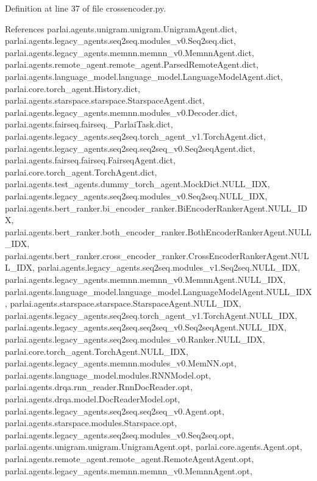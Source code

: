 Definition at line 37 of file crossencoder.\+py.



References parlai.\+agents.\+unigram.\+unigram.\+Unigram\+Agent.\+dict, parlai.\+agents.\+legacy\+\_\+agents.\+seq2seq.\+modules\+\_\+v0.\+Seq2seq.\+dict, parlai.\+agents.\+legacy\+\_\+agents.\+memnn.\+memnn\+\_\+v0.\+Memnn\+Agent.\+dict, parlai.\+agents.\+remote\+\_\+agent.\+remote\+\_\+agent.\+Parsed\+Remote\+Agent.\+dict, parlai.\+agents.\+language\+\_\+model.\+language\+\_\+model.\+Language\+Model\+Agent.\+dict, parlai.\+core.\+torch\+\_\+agent.\+History.\+dict, parlai.\+agents.\+starspace.\+starspace.\+Starspace\+Agent.\+dict, parlai.\+agents.\+legacy\+\_\+agents.\+memnn.\+modules\+\_\+v0.\+Decoder.\+dict, parlai.\+agents.\+fairseq.\+fairseq.\+\_\+\+Parlai\+Task.\+dict, parlai.\+agents.\+legacy\+\_\+agents.\+seq2seq.\+torch\+\_\+agent\+\_\+v1.\+Torch\+Agent.\+dict, parlai.\+agents.\+legacy\+\_\+agents.\+seq2seq.\+seq2seq\+\_\+v0.\+Seq2seq\+Agent.\+dict, parlai.\+agents.\+fairseq.\+fairseq.\+Fairseq\+Agent.\+dict, parlai.\+core.\+torch\+\_\+agent.\+Torch\+Agent.\+dict, parlai.\+agents.\+test\+\_\+agents.\+dummy\+\_\+torch\+\_\+agent.\+Mock\+Dict.\+N\+U\+L\+L\+\_\+\+I\+DX, parlai.\+agents.\+legacy\+\_\+agents.\+seq2seq.\+modules\+\_\+v0.\+Seq2seq.\+N\+U\+L\+L\+\_\+\+I\+DX, parlai.\+agents.\+bert\+\_\+ranker.\+bi\+\_\+encoder\+\_\+ranker.\+Bi\+Encoder\+Ranker\+Agent.\+N\+U\+L\+L\+\_\+\+I\+DX, parlai.\+agents.\+bert\+\_\+ranker.\+both\+\_\+encoder\+\_\+ranker.\+Both\+Encoder\+Ranker\+Agent.\+N\+U\+L\+L\+\_\+\+I\+DX, parlai.\+agents.\+bert\+\_\+ranker.\+cross\+\_\+encoder\+\_\+ranker.\+Cross\+Encoder\+Ranker\+Agent.\+N\+U\+L\+L\+\_\+\+I\+DX, parlai.\+agents.\+legacy\+\_\+agents.\+seq2seq.\+modules\+\_\+v1.\+Seq2seq.\+N\+U\+L\+L\+\_\+\+I\+DX, parlai.\+agents.\+legacy\+\_\+agents.\+memnn.\+memnn\+\_\+v0.\+Memnn\+Agent.\+N\+U\+L\+L\+\_\+\+I\+DX, parlai.\+agents.\+language\+\_\+model.\+language\+\_\+model.\+Language\+Model\+Agent.\+N\+U\+L\+L\+\_\+\+I\+DX, parlai.\+agents.\+starspace.\+starspace.\+Starspace\+Agent.\+N\+U\+L\+L\+\_\+\+I\+DX, parlai.\+agents.\+legacy\+\_\+agents.\+seq2seq.\+torch\+\_\+agent\+\_\+v1.\+Torch\+Agent.\+N\+U\+L\+L\+\_\+\+I\+DX, parlai.\+agents.\+legacy\+\_\+agents.\+seq2seq.\+seq2seq\+\_\+v0.\+Seq2seq\+Agent.\+N\+U\+L\+L\+\_\+\+I\+DX, parlai.\+agents.\+legacy\+\_\+agents.\+seq2seq.\+modules\+\_\+v0.\+Ranker.\+N\+U\+L\+L\+\_\+\+I\+DX, parlai.\+core.\+torch\+\_\+agent.\+Torch\+Agent.\+N\+U\+L\+L\+\_\+\+I\+DX, parlai.\+agents.\+legacy\+\_\+agents.\+memnn.\+modules\+\_\+v0.\+Mem\+N\+N.\+opt, parlai.\+agents.\+language\+\_\+model.\+modules.\+R\+N\+N\+Model.\+opt, parlai.\+agents.\+drqa.\+rnn\+\_\+reader.\+Rnn\+Doc\+Reader.\+opt, parlai.\+agents.\+drqa.\+model.\+Doc\+Reader\+Model.\+opt, parlai.\+agents.\+legacy\+\_\+agents.\+seq2seq.\+seq2seq\+\_\+v0.\+Agent.\+opt, parlai.\+agents.\+starspace.\+modules.\+Starspace.\+opt, parlai.\+agents.\+legacy\+\_\+agents.\+seq2seq.\+modules\+\_\+v0.\+Seq2seq.\+opt, parlai.\+agents.\+unigram.\+unigram.\+Unigram\+Agent.\+opt, parlai.\+core.\+agents.\+Agent.\+opt, parlai.\+agents.\+remote\+\_\+agent.\+remote\+\_\+agent.\+Remote\+Agent\+Agent.\+opt, parlai.\+agents.\+legacy\+\_\+agents.\+memnn.\+memnn\+\_\+v0.\+Memnn\+Agent.\+opt, 